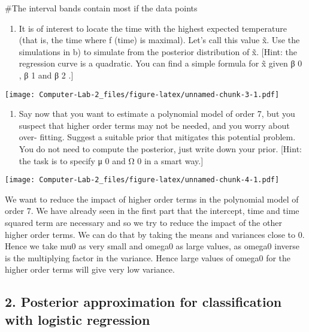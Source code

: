 \documentclass[]{article}
\providecommand{\tightlist}{%
  \setlength{\itemsep}{0pt}\setlength{\parskip}{0pt}}
\begin{document}
\#The interval bands contain most if the data points

\begin{enumerate}
\def\labelenumi{(\alph{enumi})}
\setcounter{enumi}{2}
\tightlist
\item
  It is of interest to locate the time with the highest expected
  temperature (that is, the time where f (time) is maximal). Let's call
  this value x̃. Use the simulations in b) to simulate from the posterior
  distribution of x̃. {[}Hint: the regression curve is a quadratic. You
  can find a simple formula for x̃ given β 0 , β 1 and β 2 .{]}
\end{enumerate}

\texttt{[image: Computer-Lab-2\_files/figure-latex/unnamed-chunk-3-1.pdf]}

\begin{enumerate}
\def\labelenumi{(\alph{enumi})}
\setcounter{enumi}{3}
\tightlist
\item
  Say now that you want to estimate a polynomial model of order 7, but
  you suspect that higher order terms may not be needed, and you worry
  about over- fitting. Suggest a suitable prior that mitigates this
  potential problem. You do not need to compute the posterior, just
  write down your prior. {[}Hint: the task is to specify μ 0 and Ω 0 in
  a smart way.{]}
\end{enumerate}

\texttt{[image: Computer-Lab-2\_files/figure-latex/unnamed-chunk-4-1.pdf]}

We want to reduce the impact of higher order terms in the polynomial
model of order 7. We have already seen in the first part that the
intercept, time and time squared term are necessary and so we try to
reduce the impact of the other higher order terms. We can do that by
taking the means and variances close to 0. Hence we take mu0 as very
small and omega0 as large values, as omega0 inverse is the multiplying
factor in the variance. Hence large values of omega0 for the higher
order terms will give very low variance.

\hypertarget{posterior-approximation-for-classification-with-logistic-regression}{%
\subsection{2. Posterior approximation for classification with logistic
regression}\label{posterior-approximation-for-classification-with-logistic-regression}}
\end{document}

